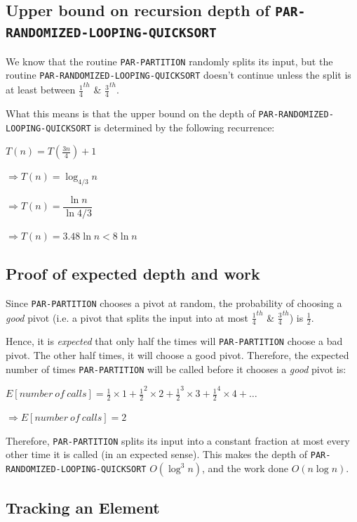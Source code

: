 \documentclass{article}
\begin{document}
\subsection{Upper bound on recursion depth of \texttt{PAR-RANDOMIZED-LOOPING-QUICKSORT}}

We know that the routine \texttt{PAR-PARTITION} randomly splits its
input, but the routine \texttt{PAR-RANDOMIZED-LOOPING-QUICKSORT}
doesn't continue unless the split is at least between
$\frac{1}{4}^{th}$ \& $\frac{3}{4}^{th}$.

What this means is that the upper bound on the depth of
\texttt{PAR-RANDOMIZED-LOOPING-QUICKSORT} is determined by the
following recurrence:

$T(n) = T(\frac{3n}{4}) + 1$

$\Rightarrow T(n) = \log_{4/3}{n}$

$\Rightarrow T(n) = \dfrac{\ln{n}}{\ln{4/3}}$

$\Rightarrow T(n) = 3.48\ln{n} < 8\ln{n}$

\subsection{Proof of expected depth and work}

Since \texttt{PAR-PARTITION} chooses a pivot at random, the
probability of choosing a \textit{good} pivot (i.e. a pivot that
splits the input into at most $\frac{1}{4}^{th}$ \&
$\frac{3}{4}^{th}$) is $\frac{1}{2}$.

Hence, it is \textit{expected} that only half the times will
\texttt{PAR-PARTITION} choose a bad pivot. The other half times, it
will choose a good pivot. Therefore, the expected number of times
\texttt{PAR-PARTITION} will be called before it chooses a
\textit{good} pivot is:

$E[number\ of\ calls] = \frac{1}{2} \times 1 + \frac{1}{2}^2 \times 2 +
\frac{1}{2}^3 \times 3 + \frac{1}{2}^4 \times 4 + \ldots$

$\Rightarrow E[number\ of\ calls] = 2$

Therefore, \texttt{PAR-PARTITION} splits its input into a constant
fraction at most every other time it is called (in an expected
sense). This makes the depth of
\texttt{PAR-RANDOMIZED-LOOPING-QUICKSORT} $O(\log^{3}{n})$, and the
work done $O(n\log{n})$.

\subsection{Tracking an Element}
\end{document}
